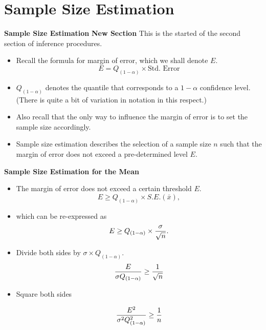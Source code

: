 \documentclass[]{report}
\begin{document}
\section{Sample Size Estimation}


\textbf{Sample Size Estimation}
\textbf{New Section} This is the started of the second section of inference procedures.
\begin{itemize} \item  Recall the formula for margin of error, which we shall denote $E$.
\[  E = Q_{(1-\alpha)} \times \mbox{Std. Error}\]

\item  $Q_{(1-\alpha)}$ denotes the quantile that corresponds to a $1-\alpha$ confidence level. (There is quite a bit of variation in notation in this respect.)
\item  Also recall that the only way to influence the margin of error is to set the sample size accordingly.

\item  Sample size estimation describes the selection of a sample size $n$ such that the margin of error does not exceed a pre-determined level $E$.
\end{itemize}



\textbf{Sample Size Estimation for the Mean}

\begin{itemize}

\item  The margin of error does not exceed a certain threshold $E$.
\[ E \geq Q_{(1-\alpha)} \times S.E.(\bar{x}), \]

\item  which can be re-expressed as
\[E \geq Q_{(1-\alpha)} \times {\sigma \over \sqrt{n} }.\]

\item  Divide both sides by $\sigma \times Q_{(1-\alpha)}$.
\[ \frac{E}{\sigma Q_{(1-\alpha)}} \geq {1 \over \sqrt{n} } \]

\item  Square both sides

\[ \frac{E^2}{\sigma^2 Q_{(1-\alpha)}^2} \geq {1 \over n } \]

\end{itemize}

\end{document}
